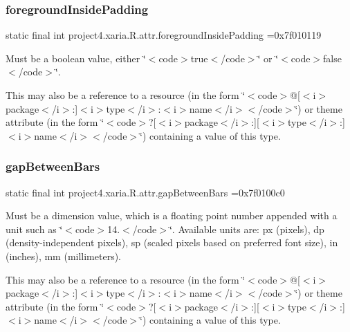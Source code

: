 \subsubsection{\texorpdfstring{foreground\+Inside\+Padding}{foregroundInsidePadding}}
{\footnotesize\ttfamily static final int project4.\+xaria.\+R.\+attr.\+foreground\+Inside\+Padding =0x7f010119\hspace{0.3cm}{\ttfamily [static]}}

Must be a boolean value, either \char`\"{}$<$code$>$true$<$/code$>$\char`\"{} or \char`\"{}$<$code$>$false$<$/code$>$\char`\"{}. 

This may also be a reference to a resource (in the form \char`\"{}$<$code$>$@\mbox{[}$<$i$>$package$<$/i$>$\+:\mbox{]}$<$i$>$type$<$/i$>$\+:$<$i$>$name$<$/i$>$$<$/code$>$\char`\"{}) or theme attribute (in the form \char`\"{}$<$code$>$?\mbox{[}$<$i$>$package$<$/i$>$\+:\mbox{]}\mbox{[}$<$i$>$type$<$/i$>$\+:\mbox{]}$<$i$>$name$<$/i$>$$<$/code$>$\char`\"{}) containing a value of this type. \mbox{\label{classproject4_1_1xaria_1_1R_1_1attr_ac111bd3841ac9b65fb43125328868172}} 
\subsubsection{\texorpdfstring{gap\+Between\+Bars}{gapBetweenBars}}
{\footnotesize\ttfamily static final int project4.\+xaria.\+R.\+attr.\+gap\+Between\+Bars =0x7f0100c0\hspace{0.3cm}{\ttfamily [static]}}

Must be a dimension value, which is a floating point number appended with a unit such as \char`\"{}$<$code$>$14.\+5sp$<$/code$>$\char`\"{}. Available units are\+: px (pixels), dp (density-\/independent pixels), sp (scaled pixels based on preferred font size), in (inches), mm (millimeters). 

This may also be a reference to a resource (in the form \char`\"{}$<$code$>$@\mbox{[}$<$i$>$package$<$/i$>$\+:\mbox{]}$<$i$>$type$<$/i$>$\+:$<$i$>$name$<$/i$>$$<$/code$>$\char`\"{}) or theme attribute (in the form \char`\"{}$<$code$>$?\mbox{[}$<$i$>$package$<$/i$>$\+:\mbox{]}\mbox{[}$<$i$>$type$<$/i$>$\+:\mbox{]}$<$i$>$name$<$/i$>$$<$/code$>$\char`\"{}) containing a value of this type. \mbox{\label{classproject4_1_1xaria_1_1R_1_1attr_ad9505defc0256b441a407d0d133b8e6c}} 
